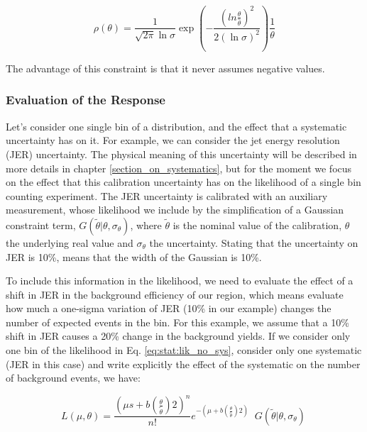 \begin{equation}
\label{eq:stat:lognorm}
\rho( \theta) = \frac{1}{\sqrt{2\pi}\ln{\sigma}}\exp\left( -\frac{(ln{\frac{\theta}{\hat{\theta}}})^2}{2(\ln{\sigma})^2} \right)\frac{1}{\theta}
\end{equation}

\noindent The advantage of this constraint is that it never assumes negative values.


\subsubsection*{Evaluation of the Response}

Let’s consider one single bin of a distribution, and the effect that a systematic uncertainty has on it. For example, we can consider the jet energy resolution (JER) uncertainty. The physical meaning of this uncertainty will be described in more details in chapter \ref{section_on_systematics}, but for the moment we focus on the effect that this calibration uncertainty has on the likelihood of a single bin counting experiment. The JER uncertainty is calibrated with an auxiliary measurement, whose likelihood we include by the simplification of a Gaussian constraint term, $G( \tilde{\theta} | \theta, \sigma_\theta)$, where $\tilde{\theta}$ is the nominal value of the calibration, $\theta$ the underlying real value and $\sigma_\theta$ the uncertainty. Stating that the uncertainty on JER is 10\%, means that the width of the Gaussian is 10\%. 

To include this information in the likelihood, we need to evaluate the effect of a shift in JER in the background efficiency of our region, which means evaluate how much a one-sigma variation of JER (10\% in our example) changes the number of expected events in the bin. 
For this example, we assume that a 10\% shift in JER causes a 20\% change in the background yields.
If we consider only one bin of the likelihood in Eq. \ref{eq:stat:lik_no_sys}, consider only one systematic (JER in this case) and write explicitly the effect of the systematic on the number of background events, we have:

\begin{equation}
\label{eq:stat:lik_one_bin_sys_pre}
L(\mu, \theta) =
\frac{ (\mu s +
b \left( \frac{\theta}{\tilde{\theta}} \right) 2 )^{n} }{ n! }
e^{- (\mu  + b\left(\frac{\theta}{\tilde{\theta} }\right)2)}   \;\;
G( \tilde{\theta} | \theta, \sigma_\theta) \ 
\end{equation}

